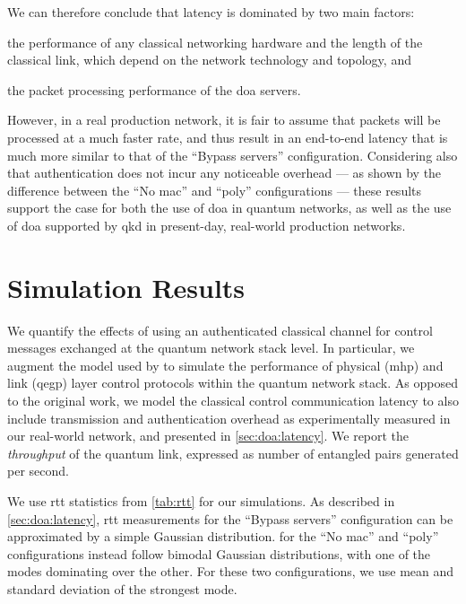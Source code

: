 We can therefore conclude that latency is dominated by two main factors:
%
\begin{inlinelist}
    \item the performance of any classical networking hardware and the length of the classical link,
          which depend on the network technology and topology, and
    \item the packet processing performance of the \acrshort{doa} servers.
\end{inlinelist}
However, in a real production network, it is fair to assume that packets will be processed at a much
faster rate, and thus result in an end-to-end latency that is much more similar to that of the
``Bypass servers'' configuration. Considering also that authentication does not incur any noticeable
overhead --- as shown by the difference between the ``No \acrshort{mac}'' and ``\acrshort{poly}''
configurations --- these results support the case for both the use of \acrshort{doa} in quantum
networks, as well as the use of \acrshort{doa} supported by \acrshort{qkd} in present-day,
real-world production networks.

\section{Simulation Results}
\label{sec:doa:results}

We quantify the effects of using an authenticated classical channel for control messages exchanged
at the quantum network stack level. In particular, we augment the model used by
\textcite{dahlberg_2019_egp} to simulate the performance of physical (\acrshort{mhp}) and link
(\acrshort{qegp}) layer control protocols within the quantum network stack. As opposed to the
original work, we model the classical control communication latency to also include transmission and
authentication overhead as experimentally measured in our real-world network, and presented in
\cref{sec:doa:latency}. We report the \emph{throughput} of the quantum link, expressed as number of
entangled pairs generated per second.

We use \acrshort{rtt} statistics from \cref{tab:rtt} for our simulations. As described in
\cref{sec:doa:latency}, \acrshort{rtt} measurements for the ``Bypass servers'' configuration can be
approximated by a simple Gaussian distribution.  for the ``No \acrshort{mac}'' and
``\acrshort{poly}'' configurations instead follow bimodal Gaussian distributions, with one of the
modes dominating over the other. For these two configurations, we use mean and standard deviation of
the strongest mode.

